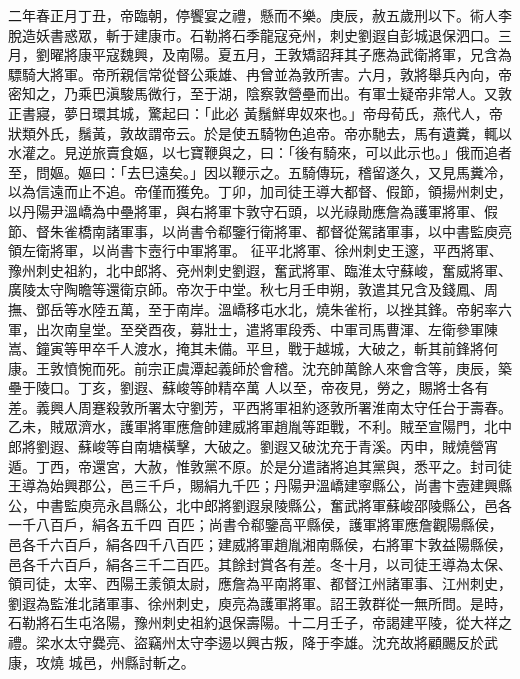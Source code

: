\begin{pinyinscope}
 二年春正月丁丑，帝臨朝，停饗宴之禮，懸而不樂。庚辰，赦五歲刑以下。術人李脫造妖書惑眾，斬于建康市。石勒將石季龍寇兗州，刺史劉遐自彭城退保泗口。三月，劉曜將康平寇魏興，及南陽。夏五月，王敦矯詔拜其子應為武衛將軍，兄含為驃騎大將軍。帝所親信常從督公乘雄、冉曾並為敦所害。六月，敦將舉兵內向，帝密知之，乃乘巴滇駿馬微行，至于湖，陰察敦營壘而出。有軍士疑帝非常人。又敦正書寢，夢日環其城，驚起曰：「此必
 黃鬚鮮卑奴來也。」帝母荀氏，燕代人，帝狀類外氏，鬚黃，敦故謂帝云。於是使五騎物色追帝。帝亦馳去，馬有遺糞，輒以水灌之。見逆旅賣食嫗，以七寶鞭與之，曰：「後有騎來，可以此示也。」俄而追者至，問嫗。嫗曰：「去巳遠矣。」因以鞭示之。五騎傳玩，稽留遂久，又見馬糞冷，以為信遠而止不追。帝僅而獲免。丁卯，加司徒王導大都督、假節，領揚州刺史，以丹陽尹溫嶠為中壘將軍，與右將軍卞敦守石頭，以光祿勛應詹為護軍將軍、假節、督朱雀橋南諸軍事，以尚書令郗鑒行衛將軍、都督從駕諸軍事，以中書監庾亮領左衛將軍，以尚書卞壼行中軍將軍。
 征平北將軍、徐州刺史王邃，平西將軍、豫州刺史祖約，北中郎將、兗州刺史劉遐，奮武將軍、臨淮太守蘇峻，奮威將軍、廣陵太守陶瞻等還衛京師。帝次于中堂。秋七月壬申朔，敦遣其兄含及錢鳳、周撫、鄧岳等水陸五萬，至于南岸。溫嶠移屯水北，燒朱雀桁，以挫其鋒。帝躬率六軍，出次南皇堂。至癸酉夜，募壯士，遣將軍段秀、中軍司馬曹渾、左衛參軍陳嵩、鐘寅等甲卒千人渡水，掩其未備。平旦，戰于越城，大破之，斬其前鋒將何康。王敦憤惋而死。前宗正虞潭起義師於會稽。沈充帥萬餘人來會含等，庚辰，築壘于陵口。丁亥，劉遐、蘇峻等帥精卒萬
 人以至，帝夜見，勞之，賜將士各有差。義興人周蹇殺敦所署太守劉芳，平西將軍祖約逐敦所署淮南太守任台于壽春。乙未，賊眾濟水，護軍將軍應詹帥建威將軍趙胤等距戰，不利。賊至宣陽門，北中郎將劉遐、蘇峻等自南塘橫擊，大破之。劉遐又破沈充于青溪。丙申，賊燒營宵遁。丁西，帝還宮，大赦，惟敦黨不原。於是分遣諸將追其黨與，悉平之。封司徒王導為始興郡公，邑三千戶，賜絹九千匹；丹陽尹溫嶠建寧縣公，尚書卞壼建興縣公，中書監庾亮永昌縣公，北中郎將劉遐泉陵縣公，奮武將軍蘇峻邵陵縣公，邑各一千八百戶，絹各五千四
 百匹；尚書令郗鑒高平縣侯，護軍將軍應詹觀陽縣侯，邑各千六百戶，絹各四千八百匹；建威將軍趙胤湘南縣侯，右將軍卞敦益陽縣侯，邑各千六百戶，絹各三千二百匹。其餘封賞各有差。冬十月，以司徒王導為太保、領司徒，太宰、西陽王羕領太尉，應詹為平南將軍、都督江州諸軍事、江州刺史，劉遐為監淮北諸軍事、徐州刺史，庾亮為護軍將軍。詔王敦群從一無所問。是時，石勒將石生屯洛陽，豫州刺史祖約退保壽陽。十二月壬子，帝謁建平陵，從大祥之禮。梁水太守爨亮、盜竊州太守李逷以興古叛，降于李雄。沈充故將顧颺反於武康，攻燒
 城邑，州縣討斬之。




\end{pinyinscope}
